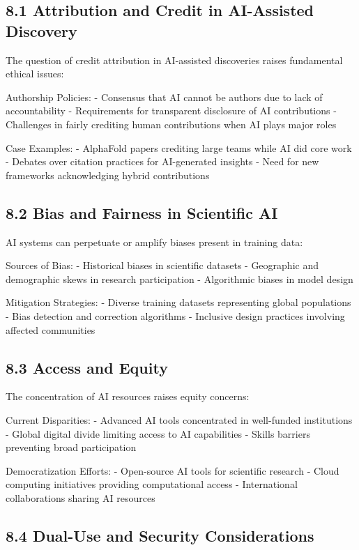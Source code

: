 \documentclass{article}
\begin{document}
\subsection{8.1 Attribution and Credit in AI-Assisted Discovery}

The question of credit attribution in AI-assisted discoveries raises fundamental ethical issues:


Authorship Policies:
- Consensus that AI cannot be authors due to lack of accountability
- Requirements for transparent disclosure of AI contributions
- Challenges in fairly crediting human contributions when AI plays major roles


Case Examples:
- AlphaFold papers crediting large teams while AI did core work
- Debates over citation practices for AI-generated insights
- Need for new frameworks acknowledging hybrid contributions


\subsection{8.2 Bias and Fairness in Scientific AI}

AI systems can perpetuate or amplify biases present in training data:


Sources of Bias:
- Historical biases in scientific datasets
- Geographic and demographic skews in research participation
- Algorithmic biases in model design


Mitigation Strategies:
- Diverse training datasets representing global populations
- Bias detection and correction algorithms
- Inclusive design practices involving affected communities


\subsection{8.3 Access and Equity}

The concentration of AI resources raises equity concerns:


Current Disparities:
- Advanced AI tools concentrated in well-funded institutions
- Global digital divide limiting access to AI capabilities
- Skills barriers preventing broad participation


Democratization Efforts:
- Open-source AI tools for scientific research
- Cloud computing initiatives providing computational access
- International collaborations sharing AI resources


\subsection{8.4 Dual-Use and Security Considerations}
\end{document}
